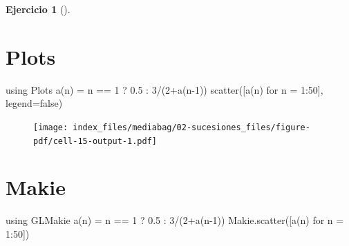 \documentclass[
  a4paper,
]{scrreport}
\newenvironment{Shaded}{\begin{snugshade}}{\end{snugshade}}
\newcommand{\BuiltInTok}[1]{\textcolor[rgb]{0.00,0.23,0.31}{#1}}
\newcommand{\ConstantTok}[1]{\textcolor[rgb]{0.56,0.35,0.01}{#1}}
\newcommand{\FloatTok}[1]{\textcolor[rgb]{0.68,0.00,0.00}{#1}}
\newcommand{\FunctionTok}[1]{\textcolor[rgb]{0.28,0.35,0.67}{#1}}
\newcommand{\ImportTok}[1]{\textcolor[rgb]{0.00,0.46,0.62}{#1}}
\newcommand{\NormalTok}[1]{\textcolor[rgb]{0.00,0.23,0.31}{#1}}
\newcommand{\OperatorTok}[1]{\textcolor[rgb]{0.37,0.37,0.37}{#1}}
\theoremstyle{definition}
\newtheorem{exercise}{Ejercicio}[chapter]
\theoremstyle{remark}
\begin{document}
\begin{exercise}[]
\begin{tcolorbox}
\section{Plots}

\begin{Shaded}
\begin{Highlighting}[]
\ImportTok{using} \BuiltInTok{Plots}
\FunctionTok{a}\NormalTok{(n) }\OperatorTok{=}\NormalTok{  n }\OperatorTok{==} \FloatTok{1}\NormalTok{ ? }\FloatTok{0.5} \OperatorTok{:} \FloatTok{3}\OperatorTok{/}\NormalTok{(}\FloatTok{2}\FunctionTok{+a}\NormalTok{(n}\OperatorTok{{-}}\FloatTok{1}\NormalTok{))}
\FunctionTok{scatter}\NormalTok{([}\FunctionTok{a}\NormalTok{(n) for n }\OperatorTok{=} \FloatTok{1}\OperatorTok{:}\FloatTok{50}\NormalTok{], legend}\OperatorTok{=}\ConstantTok{false}\NormalTok{)}
\end{Highlighting}
\end{Shaded}

\begin{figure}[H]

{\centering \texttt{[image: index\_files/mediabag/02-sucesiones\_files/figure-pdf/cell-15-output-1.pdf]}

}

\end{figure}

\section{Makie}

\begin{Shaded}
\begin{Highlighting}[]
\ImportTok{using} \BuiltInTok{GLMakie}
\FunctionTok{a}\NormalTok{(n) }\OperatorTok{=}\NormalTok{ n }\OperatorTok{==} \FloatTok{1}\NormalTok{ ? }\FloatTok{0.5} \OperatorTok{:} \FloatTok{3}\OperatorTok{/}\NormalTok{(}\FloatTok{2}\FunctionTok{+a}\NormalTok{(n}\OperatorTok{{-}}\FloatTok{1}\NormalTok{))}
\NormalTok{Makie.}\FunctionTok{scatter}\NormalTok{([}\FunctionTok{a}\NormalTok{(n) for n }\OperatorTok{=} \FloatTok{1}\OperatorTok{:}\FloatTok{50}\NormalTok{])}
\end{Highlighting}
\end{Shaded}

\begin{figure}[H]


\end{figure}
\end{tcolorbox}
\end{exercise}
\end{document}

